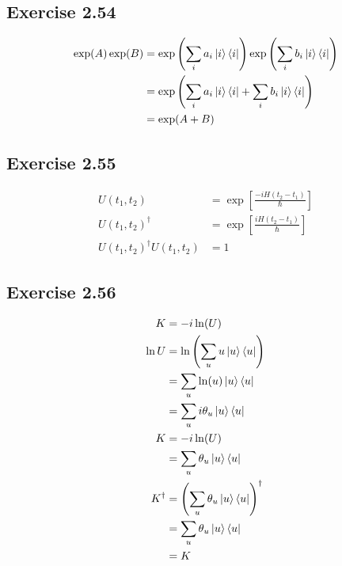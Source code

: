 \documentclass{article}
\begin{document}
\subsection*{Exercise 2.54}

\begin{align*}
  \exp(A) \exp(B) & = \exp \left( \sum_i a_i \ket{i} \bra{i} \right) \exp \left( \sum_i b_i \ket{i} \bra{i} \right) \\
                  & = \exp \left( \sum_i a_i \ket{i} \bra{i} + \sum_i b_i \ket{i} \bra{i} \right)                   \\
                  & = \exp(A + B)
\end{align*}

\subsection*{Exercise 2.55}

\begin{align*}
  U(t_1, t_2)                     & = \exp \left[ \frac{-i H(t_2 - t_1)}{\hbar} \right] \\
  U(t_1, t_2)^\dagger             & = \exp \left[ \frac{i H(t_2 - t_1)}{\hbar} \right]  \\
  U(t_1, t_2)^\dagger U(t_1, t_2) & = 1
\end{align*}

\subsection*{Exercise 2.56}

\begin{align*}
  K         & = -i \ln (U)                                             \\
  \ln U     & = \ln \left( \sum_u u \ket{u} \bra{u} \right)            \\
            & = \sum_u \ln (u) \ket{u} \bra{u}                         \\
            & = \sum_u i \theta_u \ket{u} \bra{u}                      \\
  K         & = -i \ln (U)                                             \\
            & = \sum_u \theta_u \ket{u} \bra{u}                        \\
  K^\dagger & = \left( \sum_u \theta_u \ket{u} \bra{u} \right)^\dagger \\
            & = \sum_u \theta_u \ket{u} \bra{u}                        \\
            & = K
\end{align*}
\end{document}
